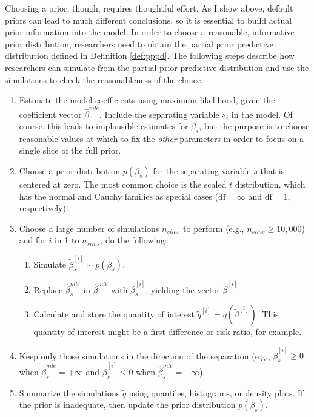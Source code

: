 \documentclass[12pt]{article}
\begin{document}
Choosing a prior, though, requires thoughtful effort. As I show above, default priors can lead to much different conclusions, so it is essential to build actual prior information into the model. In order to choose a reasonable, informative prior distribution, researchers need to obtain the partial prior predictive distribution defined in Definition \ref{def:pppd}. The following steps describe how researchers can simulate from the partial prior predictive distribution and use the simulations to check the reasonableness of the choice.
\begin{enumerate}
\item Estimate the model coefficients using maximum likelihood, given the coefficient vector $\hat{\beta}^{mle}$. Include the separating variable $s_i$ in the model. Of course, this leads to implausible estimates for $\beta_s$, but the purpose is to choose reasonable values at which to fix the \emph{other} parameters in order to focus on a single slice of the full prior. 
\item Choose a prior distribution $p(\beta_s)$ for the separating variable $s$ that is centered at zero. The most common choice is the scaled $t$ distribution, which has the normal and Cauchy families as special cases ($\text{df} = \infty$ and $\text{df} = 1$, respectively). 
\item Choose a large number of simulations $n_{sims}$ to perform (e.g., $n_{sims} \geq 10,000$) and for $i$ in 1 to $n_{sims}$, do the following:
	\begin{enumerate}
	\item Simulate $\tilde{\beta}^{[i]}_s \sim p(\beta_s)$.
	\item Replace $\hat{\beta}_s^{mle}$ in $\hat{\beta}^{mle}$ with $\tilde{\beta}^{[i]}_s$, yielding the vector $\tilde{\beta}^{[i]}$.
	\item Calculate and store the quantity of interest $\tilde{q}^{[i]} = q\left(\tilde{\beta}^{[i]}\right)$. This quantity of interest might be a first-difference or risk-ratio, for example.
	\end{enumerate}
\item Keep only those simulations in the direction of the separation (e.g., $\tilde{\beta}_s^{[i]} \geq 0$ when $\hat{\beta}_{s}^{mle} = +\infty$ and $\tilde{\beta}_s^{[i]} \leq 0$ when $\hat{\beta}_{s}^{mle} = -\infty$).
\item Summarize the simulations $\tilde{q}$ using quantiles, histograms, or density plots. If the prior is inadequate, then update the prior distribution $p(\beta_s)$.
\end{enumerate}
\end{document}
